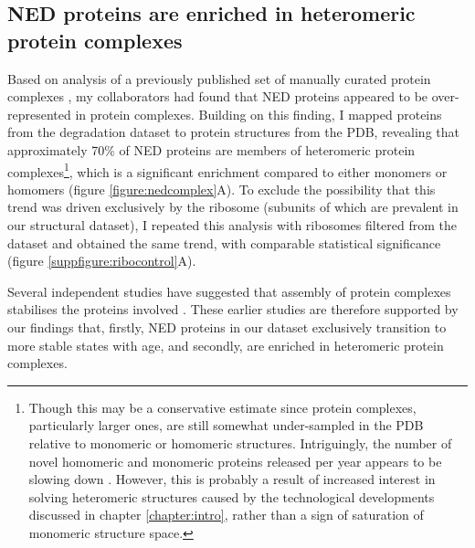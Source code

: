 \documentclass[a4paper,11pt,twoside,openright]{scrbook}
\begin{document}
\subsection{NED proteins are enriched in heteromeric protein complexes}
Based on analysis of a previously published set of manually curated protein
complexes \cite{Ori2016}, my collaborators had found that NED proteins appeared
to be over-represented in protein complexes. Building on this finding, I mapped
proteins from the degradation dataset to protein structures from the PDB,
revealing that approximately 70\% of NED proteins are members of heteromeric
protein complexes\footnote{Though this may be a conservative estimate since
protein complexes, particularly larger ones, are still somewhat under-sampled in
the PDB relative to monomeric or homomeric structures. Intriguingly, the number
of novel homomeric and monomeric proteins released per year appears to be
slowing down \cite{Perica2012a,Marsh2015}. However, this is probably a result of
increased interest in solving heteromeric structures caused by the technological
developments discussed in chapter \ref{chapter:intro}, rather than a sign of
saturation of monomeric structure space.}, which is a significant enrichment
compared to either monomers or homomers (figure \ref{figure:nedcomplex}A). To
exclude the possibility that this trend was driven exclusively by the ribosome
(subunits of which are prevalent in our structural dataset), I repeated this
analysis with ribosomes filtered from the dataset and obtained the same trend,
with comparable statistical significance (figure \ref{suppfigure:ribocontrol}A).

Several independent studies have suggested that assembly of protein complexes
stabilises the proteins involved \cite{Goldberg2003,Malinverni2006,Toyama2013}.
These earlier studies are therefore supported by our findings that, firstly, NED
proteins in our dataset exclusively transition to more stable states with age,
and secondly, are enriched in heteromeric protein complexes.

\end{document}
